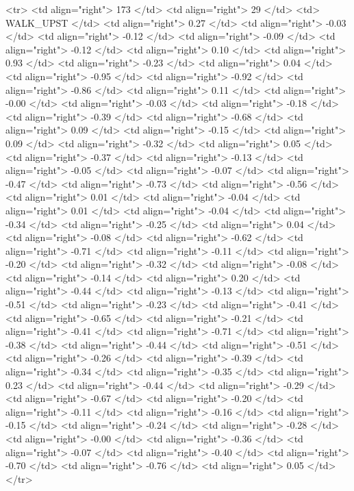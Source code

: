   <tr> <td align="right"> 173 </td> <td align="right">  29 </td> <td> WALK_UPST </td> <td align="right"> 0.27 </td> <td align="right"> -0.03 </td> <td align="right"> -0.12 </td> <td align="right"> -0.09 </td> <td align="right"> -0.12 </td> <td align="right"> 0.10 </td> <td align="right"> 0.93 </td> <td align="right"> -0.23 </td> <td align="right"> 0.04 </td> <td align="right"> -0.95 </td> <td align="right"> -0.92 </td> <td align="right"> -0.86 </td> <td align="right"> 0.11 </td> <td align="right"> -0.00 </td> <td align="right"> -0.03 </td> <td align="right"> -0.18 </td> <td align="right"> -0.39 </td> <td align="right"> -0.68 </td> <td align="right"> 0.09 </td> <td align="right"> -0.15 </td> <td align="right"> 0.09 </td> <td align="right"> -0.32 </td> <td align="right"> 0.05 </td> <td align="right"> -0.37 </td> <td align="right"> -0.13 </td> <td align="right"> -0.05 </td> <td align="right"> -0.07 </td> <td align="right"> -0.47 </td> <td align="right"> -0.73 </td> <td align="right"> -0.56 </td> <td align="right"> 0.01 </td> <td align="right"> -0.04 </td> <td align="right"> 0.01 </td> <td align="right"> -0.04 </td> <td align="right"> -0.34 </td> <td align="right"> -0.25 </td> <td align="right"> 0.04 </td> <td align="right"> -0.08 </td> <td align="right"> -0.62 </td> <td align="right"> -0.71 </td> <td align="right"> -0.11 </td> <td align="right"> -0.20 </td> <td align="right"> -0.32 </td> <td align="right"> -0.08 </td> <td align="right"> -0.14 </td> <td align="right"> 0.20 </td> <td align="right"> -0.44 </td> <td align="right"> -0.13 </td> <td align="right"> -0.51 </td> <td align="right"> -0.23 </td> <td align="right"> -0.41 </td> <td align="right"> -0.65 </td> <td align="right"> -0.21 </td> <td align="right"> -0.41 </td> <td align="right"> -0.71 </td> <td align="right"> -0.38 </td> <td align="right"> -0.44 </td> <td align="right"> -0.51 </td> <td align="right"> -0.26 </td> <td align="right"> -0.39 </td> <td align="right"> -0.34 </td> <td align="right"> -0.35 </td> <td align="right"> 0.23 </td> <td align="right"> -0.44 </td> <td align="right"> -0.29 </td> <td align="right"> -0.67 </td> <td align="right"> -0.20 </td> <td align="right"> -0.11 </td> <td align="right"> -0.16 </td> <td align="right"> -0.15 </td> <td align="right"> -0.24 </td> <td align="right"> -0.28 </td> <td align="right"> -0.00 </td> <td align="right"> -0.36 </td> <td align="right"> -0.07 </td> <td align="right"> -0.40 </td> <td align="right"> -0.70 </td> <td align="right"> -0.76 </td> <td align="right"> 0.05 </td> </tr>
